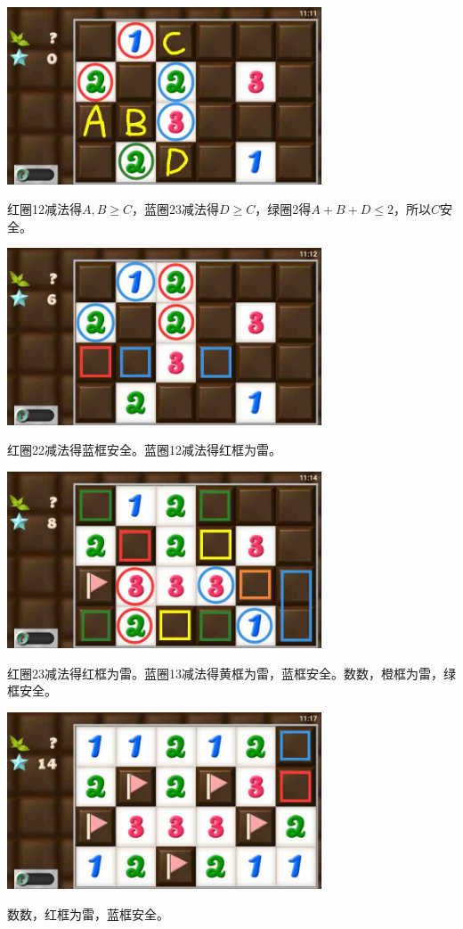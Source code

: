 \subsection{} %
\begin{center}
    \includegraphics[width=0.7\textwidth]{puzzlelow/199-1.jpg}
\end{center}
红圈12减法得$A,B\ge C$，蓝圈23减法得$D\ge C$，绿圈2得$A+B+D\le 2$，所以$C$安全。
\begin{center}
    \includegraphics[width=0.7\textwidth]{puzzlelow/199-2.jpg}
\end{center}
红圈22减法得蓝框安全。蓝圈12减法得红框为雷。
\begin{center}
    \includegraphics[width=0.7\textwidth]{puzzlelow/199-3.jpg}
\end{center}
红圈23减法得红框为雷。蓝圈13减法得黄框为雷，蓝框安全。数数，橙框为雷，绿框安全。
\begin{center}
    \includegraphics[width=0.7\textwidth]{puzzlelow/199-4.jpg}
\end{center}
数数，红框为雷，蓝框安全。

